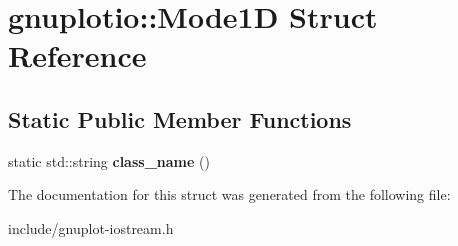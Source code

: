\hypertarget{structgnuplotio_1_1Mode1D}{}\section{gnuplotio\+:\+:Mode1D Struct Reference}
\label{structgnuplotio_1_1Mode1D}
\subsection*{Static Public Member Functions}
\begin{DoxyCompactItemize}
\item 
\mbox{\label{structgnuplotio_1_1Mode1D_a508d170d84da4dfb7cd07eebad894b8f}} 
static std\+::string {\bfseries class\+\_\+name} ()
\end{DoxyCompactItemize}


The documentation for this struct was generated from the following file\+:\begin{DoxyCompactItemize}
\item 
include/gnuplot-\/iostream.\+h\end{DoxyCompactItemize}
